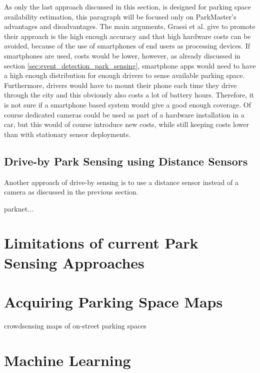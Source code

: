 As only the last approach discussed in this section, is designed for parking space availability estimation, this paragraph will be focused only on ParkMaster's advantages and disadvantages. The main arguments, Grassi et al. give to promote their approach is the high enough accuracy and that high hardware costs can be avoided, because of the use of smartphones of end users as processing devices. If smartphones are used, costs would be lower, however, as already discussed in section \ref{sec:event_detection_park_sensing}, smartphone apps would need to have a high enough distribution for enough drivers to sense available parking space. Furthermore, drivers would have to mount their phone each time they drive through the city and this obviously also costs a lot of battery hours. Therefore, it is not sure if a smartphone based system would give a good enough coverage. Of course dedicated cameras could be used as part of a hardware installation in a car, but this would of course introduce new costs, while still keeping costs lower than with stationary sensor deployments.





\subsection{Drive-by Park Sensing using Distance Sensors}
\label{sec:related_driveby_park_sensing_distance}

Another approach of drive-by sensing is to use a distance sensor instead of a camera as discussed in the previous section. 

parknet... \cite{Mathur:2010:PDS:1814433.1814448}





\section{Limitations of current Park Sensing Approaches}





\section{Acquiring Parking Space Maps}

crowdsensing maps of on-street parking spaces

\cite{Coric2013}




\section{Machine Learning}

